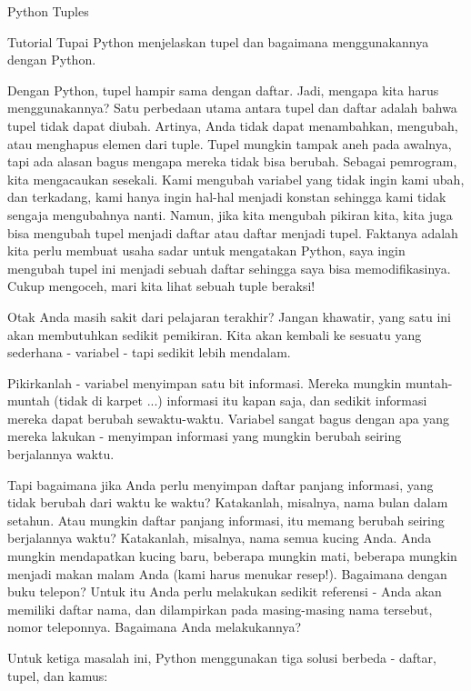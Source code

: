 Python Tuples \par
Tutorial Tupai Python menjelaskan tupel dan bagaimana menggunakannya dengan Python. \par
Dengan Python, tupel hampir sama dengan daftar. Jadi, mengapa kita harus menggunakannya? Satu perbedaan utama antara tupel dan daftar adalah bahwa tupel tidak dapat diubah. Artinya, Anda tidak dapat menambahkan, mengubah, atau menghapus elemen dari tuple. Tupel mungkin tampak aneh pada awalnya, tapi ada alasan bagus mengapa mereka tidak bisa berubah. Sebagai pemrogram, kita mengacaukan sesekali. Kami mengubah variabel yang tidak ingin kami ubah, dan terkadang, kami hanya ingin hal-hal menjadi konstan sehingga kami tidak sengaja mengubahnya nanti. Namun, jika kita mengubah pikiran kita, kita juga bisa mengubah tupel menjadi daftar atau daftar menjadi tupel. Faktanya adalah kita perlu membuat usaha sadar untuk mengatakan Python, saya ingin mengubah tupel ini menjadi sebuah daftar sehingga saya bisa memodifikasinya. Cukup mengoceh, mari kita lihat sebuah tuple beraksi! \par
Otak Anda masih sakit dari pelajaran terakhir? Jangan khawatir, yang satu ini akan membutuhkan sedikit pemikiran. Kita akan kembali ke sesuatu yang sederhana - variabel - tapi sedikit lebih mendalam. \par
\vspace{12pt}
Pikirkanlah - variabel menyimpan satu bit informasi. Mereka mungkin muntah-muntah (tidak di karpet ...) informasi itu kapan saja, dan sedikit informasi mereka dapat berubah sewaktu-waktu. Variabel sangat bagus dengan apa yang mereka lakukan - menyimpan informasi yang mungkin berubah seiring berjalannya waktu. \par
\vspace{12pt}
Tapi bagaimana jika Anda perlu menyimpan daftar panjang informasi, yang tidak berubah dari waktu ke waktu? Katakanlah, misalnya, nama bulan dalam setahun. Atau mungkin daftar panjang informasi, itu memang berubah seiring berjalannya waktu? Katakanlah, misalnya, nama semua kucing Anda. Anda mungkin mendapatkan kucing baru, beberapa mungkin mati, beberapa mungkin menjadi makan malam Anda (kami harus menukar resep!). Bagaimana dengan buku telepon? Untuk itu Anda perlu melakukan sedikit referensi - Anda akan memiliki daftar nama, dan dilampirkan pada masing-masing nama tersebut, nomor teleponnya. Bagaimana Anda melakukannya? \par
\vspace{12pt}
Untuk ketiga masalah ini, Python menggunakan tiga solusi berbeda - daftar, tupel, dan kamus: \par
